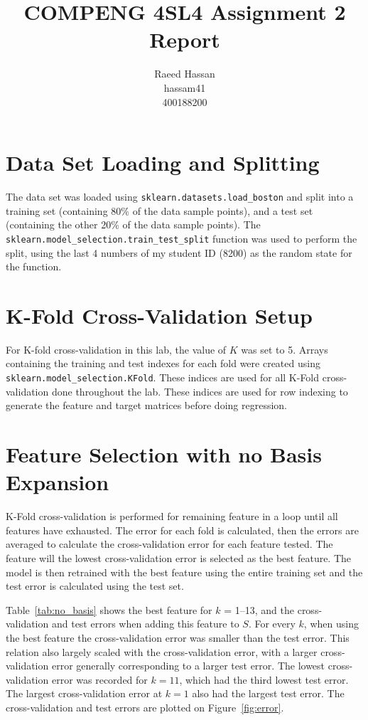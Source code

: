 \documentclass[12pt]{article}
\title{COMPENG 4SL4 Assignment 2 Report}
\author{
    Raeed Hassan \\
    hassam41 \\
    400188200
}
\begin{document}
\maketitle
\clearpage

\section*{Data Set Loading and Splitting}
The data set was loaded using \texttt{sklearn.datasets.load\_boston} and split into a training set (containing 80\% of the data sample points), and a test set (containing the other 20\% of the data sample points). The \texttt{sklearn.model\_selection.train\_test\_split} function was used to perform the split, using the last 4 numbers of my student ID (8200) as the random state for the function.

\section*{K-Fold Cross-Validation Setup}
For K-fold cross-validation in this lab, the value of $K$ was set to 5. Arrays containing the training and test indexes for each fold were created using \texttt{sklearn.model\_selection.KFold}. These indices are used for all K-Fold cross-validation done throughout the lab. These indices are used for row indexing to generate the feature and target matrices before doing regression.

\section*{Feature Selection with no Basis Expansion}
K-Fold cross-validation is performed for remaining feature in a loop until all features have exhausted. The error for each fold is calculated, then the errors are averaged to calculate the cross-validation error for each feature tested. The feature will the lowest cross-validation error is selected as the best feature. The model is then retrained with the best feature using the entire training set and the test error is calculated using the test set. 

Table~\ref{tab:no_basis} shows the best feature for $k$ = 1--13, and the cross-validation and test errors when adding this feature to $S$. For every $k$, when using the best feature the cross-validation error was smaller than the test error. This relation also largely scaled with the cross-validation error, with a larger cross-validation error generally corresponding to a larger test error. The lowest cross-validation error was recorded for $k = 11$, which had the third lowest test error. The largest cross-validation error at $k = 1$ also had the largest test error. The cross-validation and test errors are plotted on Figure~\ref{fig:error}.
\end{document}
